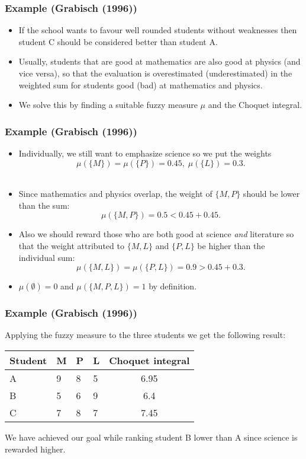 \documentclass[envcountsect]{beamer}
\begin{document}
\begin{frame}
	\frametitle{Example (Grabisch (1996))}
\begin{itemize}
\item If the school wants to favour well rounded students without weaknesses then student C should be considered better than student A. \\
\item Usually, students that are good at mathematics are also good at physics (and vice versa), so that the evaluation is overestimated (underestimated) in the weighted sum for students good (bad) at mathematics and physics. \\
\item We solve this by finding a suitable fuzzy measure $\mu$ and the Choquet integral.
\end{itemize}

\end{frame}

\begin{frame}

	\frametitle{Example (Grabisch (1996))}
\begin{itemize}
\item Individually, we still want to emphasize science so we put the weights
$$\mu(\{M\}) = \mu(\{P\}) = 0.45, \; \mu(\{L\}) = 0.3.$$\\
\item Since mathematics and physics overlap, the weight of $\{M,P\}$ should be lower than the sum:
$$
\mu(\{M,P\}) = 0.5 < 0.45 + 0.45.
$$
\item Also we should reward those who are both good at science \emph{and} literature so that the weight attributed to $\{M,L\}$ and $\{P,L\}$ be higher than the individual sum:
$$
\mu(\{M,L\}) = \mu(\{P,L\}) = 0.9 > 0.45 + 0.3.
$$
\item $\mu(\emptyset) = 0$ and $\mu(\{M,P,L\}) = 1$ by definition.
\end{itemize}
\end{frame}
\begin{frame}

	\frametitle{Example (Grabisch (1996))}
Applying the fuzzy measure to the three students we get the following result:
\begin{table}[]
\begin{tabular}{llllc}
\hline
Student  & M & P & L & Choquet integral \\
 \hline
 A & 9 & 8 & 5 &  6.95\\
 B & 5 & 6 & 9 &  6.4\\
 C & 7 & 8 & 7 &  7.45\\
 \hline
\end{tabular}
\end{table}
We have achieved our goal while ranking student B lower than A since science is rewarded higher.

\end{frame}
\end{document}
